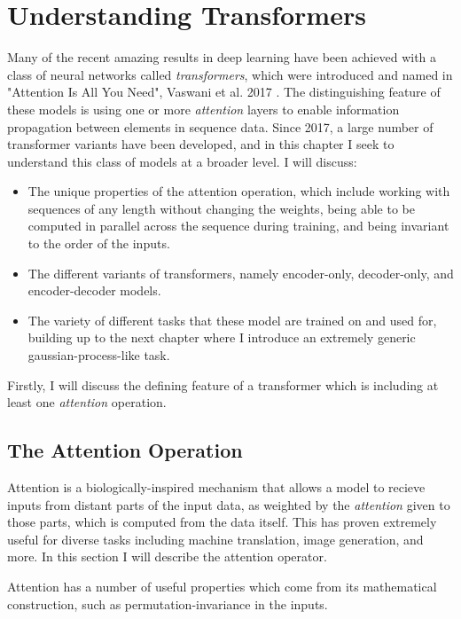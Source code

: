 \chapter{Understanding Transformers}
\label{C:transformers}

Many of the recent amazing results in deep learning have been achieved with a class of neural networks called \textit{transformers}, which were introduced and named in "Attention Is All You Need", Vaswani et al. 2017 \cite{attention-is-all-you-need}. The distinguishing feature of these models is using one or more \textit{attention} layers to enable information propagation between elements in sequence data. Since 2017, a large number of transformer variants have been developed, and in this chapter I seek to understand this class of models at a broader level. I will discuss:

\begin{itemize}
    \item The unique properties of the attention operation, which include working with sequences of any length without changing the weights, being able to be computed in parallel across the sequence during training, and being invariant to the order of the inputs.
    \item The different variants of transformers, namely encoder-only, decoder-only, and encoder-decoder models.
    \item The variety of different tasks that these model are trained on and used for, building up to the next chapter where I introduce an extremely generic gaussian-process-like task.
\end{itemize}

Firstly, I will discuss the defining feature of a transformer which is including at least one \textit{attention} operation.

\section{The Attention Operation}

Attention is a biologically-inspired mechanism that allows a model to recieve inputs from distant parts of the input data, as weighted by the \textit{attention} given to those parts, which is computed from the data itself. This has proven extremely useful for diverse tasks including machine translation, image generation, and more. In this section I will describe the attention operator.

Attention has a number of useful properties which come from its mathematical construction, such as permutation-invariance in the inputs.

